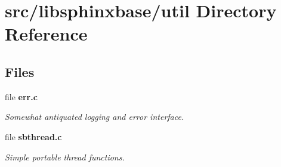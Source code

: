\section{src/libsphinxbase/util Directory Reference}
\label{dir_dc1f04dceb148346198172cb52290701}
\subsection*{Files}
\begin{DoxyCompactItemize}
\item 
file \textbf{ err.\+c}
\begin{DoxyCompactList}\small\item\em Somewhat antiquated logging and error interface. \end{DoxyCompactList}\item 
file \textbf{ sbthread.\+c}
\begin{DoxyCompactList}\small\item\em Simple portable thread functions. \end{DoxyCompactList}\end{DoxyCompactItemize}
